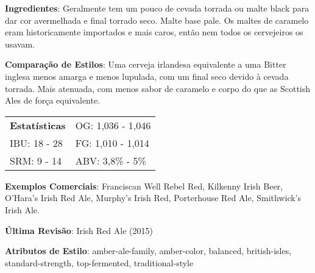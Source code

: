 \textbf{Ingredientes}: Geralmente tem um pouco de cevada torrada ou malte black para dar cor avermelhada e final torrado seco. Malte base pale. Os maltes de caramelo eram historicamente importados e mais caros, então nem todos os cervejeiros os usavam.

\textbf{Comparação de Estilos}: Uma cerveja irlandesa equivalente a uma Bitter inglesa menos amarga e menos lupulada, com um final seco devido à cevada torrada. Mais atenuada, com menos sabor de caramelo e corpo do que as Scottish Ales de força equivalente.

\begin{tabular}{@{}p{35mm}p{35mm}@{}}
  \textbf{Estatísticas} & OG: 1,036 - 1,046 \\
  IBU: 18 - 28  & FG: 1,010 - 1,014 \\
  SRM: 9 - 14  & ABV: 3,8\% - 5\%
\end{tabular}

\textbf{Exemplos Comerciais}: Franciscan Well Rebel Red, Kilkenny Irish Beer, O'Hara's Irish Red Ale, Murphy's Irish Red, Porterhouse Red Ale, Smithwick's Irish Ale.

\textbf{Última Revisão}: Irish Red Ale (2015)

\textbf{Atributos de Estilo}: amber-ale-family, amber-color, balanced, british-isles, standard-strength, top-fermented, traditional-style
